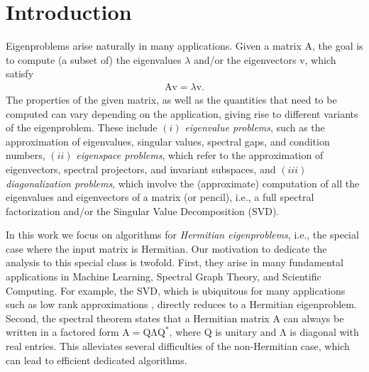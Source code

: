 \documentclass{article}
\newcommand\vecv{\boldsymbol{\mathrm{v}}}
\newcommand\matA{\boldsymbol{\mathrm{A}}}
\newcommand\matQ{\boldsymbol{\mathrm{Q}}}
\newcommand\matLambda{\boldsymbol{\mathrm{\Lambda}}}
\begin{document}
\section{Introduction}
    \label{section:introduction}
    Eigenproblems arise naturally in many applications. Given a matrix $\matA$, the goal is to compute (a subset of) the eigenvalues $\lambda$ and/or the eigenvectors $\vecv$, which satisfy
    \begin{align*}
        \matA\vecv = \lambda\vecv.
    \end{align*}
    The properties of the given matrix, as well as the quantities that need to be computed can vary depending on the application, giving rise to different variants of the eigenproblem.    These include $(i)$ \textit{eigenvalue problems}, such as the approximation of eigenvalues, singular values, spectral gaps, and condition numbers, $(ii)$ \textit{eigenspace problems}, which refer to the approximation of eigenvectors, spectral projectors, and invariant subspaces, and $(iii)$ \textit{diagonalization problems}, which involve the (approximate) computation of all the eigenvalues and eigenvectors of a matrix (or pencil), i.e., a full spectral factorization and/or the Singular Value Decomposition (SVD).
    
    
    In this work we focus on algorithms for \textit{Hermitian eigenproblems}, i.e., the special case where the input matrix is Hermitian. Our motivation to dedicate the analysis to this special class is twofold. 
    First, they arise in many fundamental applications in Machine Learning, Spectral Graph Theory, and Scientific Computing. 
    For example, the SVD, which is ubiquitous for many applications such as low rank approximations \cite{papadimitriou1998latent,frieze2004fast,drineas2008relative,clarkson2017low}, directly reduces to a Hermitian eigenproblem. 
    Second, the spectral theorem states that a Hermitian matrix $\matA$ can always be written in a factored form $\matA=\matQ\matLambda\matQ^*$, where $\matQ$ is unitary and $\matLambda$ is diagonal with real entries. 
    This alleviates several difficulties of the non-Hermitian case, which can lead to efficient dedicated algorithms. 
\end{document}
